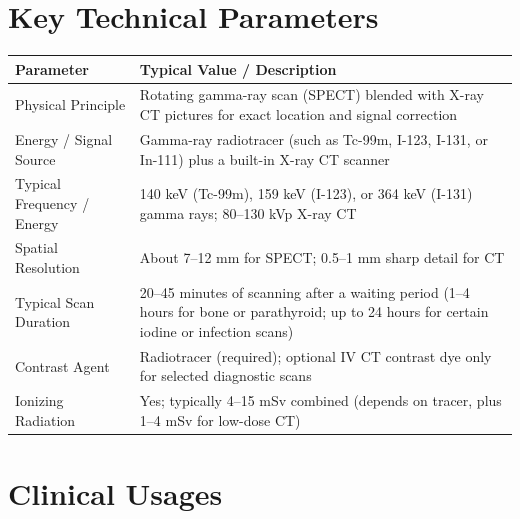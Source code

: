 \section{Key Technical Parameters}
\noindent
\begin{tabularx}{\textwidth}{@{}l X@{}}
\toprule
\textbf{Parameter} & \textbf{Typical Value / Description} \\
\midrule
Physical Principle & Rotating gamma-ray scan (SPECT) blended with X-ray CT pictures for exact location and signal correction \\
Energy / Signal Source & Gamma-ray radiotracer (such as Tc-99m, I-123, I-131, or In-111) plus a built-in X-ray CT scanner \\
Typical Frequency / Energy & 140 keV (Tc-99m), 159 keV (I-123), or 364 keV (I-131) gamma rays; 80--130 kVp X-ray CT \\
Spatial Resolution & About 7--12 mm for SPECT; 0.5--1 mm sharp detail for CT \\
Typical Scan Duration & 20--45 minutes of scanning after a waiting period (1--4 hours for bone or parathyroid; up to 24 hours for certain iodine or infection scans) \\
Contrast Agent & Radiotracer (required); optional IV CT contrast dye only for selected diagnostic scans \\
Ionizing Radiation & Yes; typically 4--15 mSv combined (depends on tracer, plus 1--4 mSv for low-dose CT) \\
\bottomrule
\end{tabularx}

\section{Clinical Usages}

